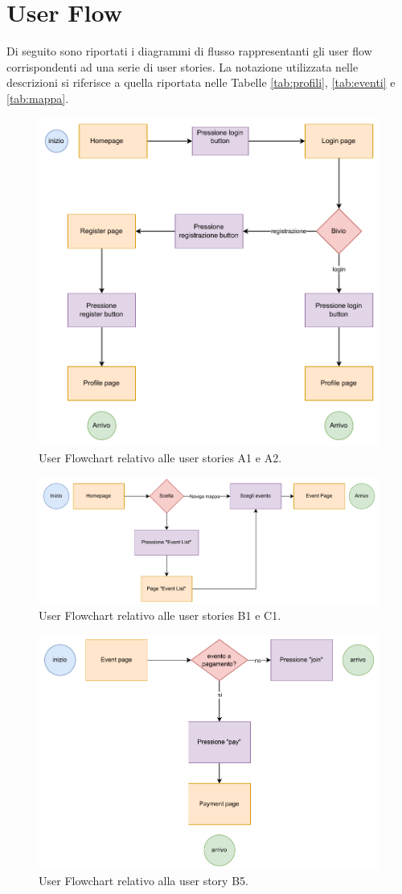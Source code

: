 \documentclass[9pt]{extarticle}
\begin{document}
\newpage
\section{User Flow}

Di seguito sono riportati i diagrammi di flusso rappresentanti gli user flow corrispondenti ad una serie di user stories. La notazione utilizzata nelle descrizioni si riferisce a quella riportata nelle Tabelle \ref{tab:profili}, \ref{tab:eventi} e \ref{tab:mappa}.

\begin{figure}[!htb]
	\centering
	\includegraphics[width=0.8\linewidth]{./images/A1-A2.drawio.pdf}
	\caption{User Flowchart relativo alle user stories A1 e A2.}
	\label{fig:A1-A2}
\end{figure}

\begin{figure}[!htb]
	\centering
	\includegraphics[width=\linewidth]{./images/EventSelection.pdf}
	\caption{User Flowchart relativo alle user stories B1 e C1.}
	\label{fig:B1-C1}
\end{figure}

\newpage

\begin{figure}[!htb]
	\centering
	\includegraphics[width=0.8\linewidth]{./images/B5.pdf}
	\caption{User Flowchart relativo alla user story B5.}
	\label{fig:B5}
\end{figure}

	
\end{document}
